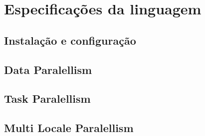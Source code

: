 \section{Especificações da linguagem}
\label{sec:especificacoes}

\subsection{Instalação e configuração}
\label{subsec:instalacao}

\subsection{Data Paralellism}
\label{subsec:datapar}

\subsection{Task Paralellism}
\label{subsec:taskpar}

\subsection{Multi Locale Paralellism}
\label{subsec:multipar}